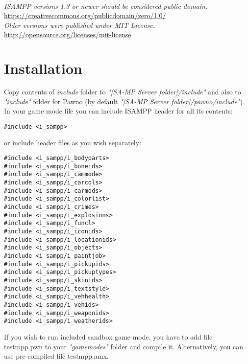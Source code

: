 \documentclass{article}
\begin{document}
\textit{\\ISAMPP versions 1.3 or newer should be considered public domain.}
\\\url{https://creativecommons.org/publicdomain/zero/1.0/}
\bigskip
\\\textit{Older versions were published under MIT License.}
\\\url{http://opensource.org/licenses/mit-license}

\section{Installation}
Copy contents of \textit{include} folder to \textit{"[SA-MP Server folder]/include"} and also to \textit{"include"} folder for Pawno (by default \textit{"[SA-MP Server folder]/pawno/include"}).
\bigskip
\\In your game mode file you can include ISAMPP header for all its contents:
\begin{verbatim}
#include <i_sampp>
\end{verbatim}
or include header files as you wish separately:
\begin{verbatim}
#include <i_sampp/i_bodyparts>
#include <i_sampp/i_boneids>
#include <i_sampp/i_cammode>
#include <i_sampp/i_carcols>
#include <i_sampp/i_carmods>
#include <i_sampp/i_colorlist>
#include <i_sampp/i_crimes>
#include <i_sampp/i_explosions>
#include <i_sampp/i_funcl>
#include <i_sampp/i_iconids>
#include <i_sampp/i_locationids>
#include <i_sampp/i_objects>
#include <i_sampp/i_paintjob>
#include <i_sampp/i_pickupids>
#include <i_sampp/i_pickuptypes>
#include <i_sampp/i_skinids>
#include <i_sampp/i_textstyle>
#include <i_sampp/i_vehhealth>
#include <i_sampp/i_vehids>
#include <i_sampp/i_weaponids>
#include <i_sampp/i_weatherids>
\end{verbatim}
If you wish to run included sandbox game mode, you have to add file testmpp.pwn to your \textit{"gamemodes"} folder and compile it. Alternatively, you can use pre-compiled file testmpp.amx.

\newpage
\end{document}
